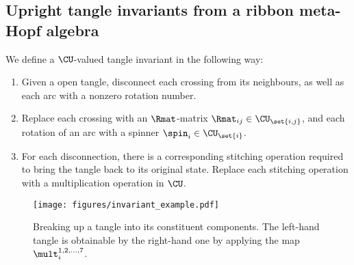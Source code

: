 \subsection{Upright tangle invariants from a ribbon meta-Hopf algebra}
We define a $\CU$-valued tangle invariant in the following way:
\begin{enumerate}
        \item Given a open tangle, disconnect each crossing from its neighbours,
                as well as each arc with a nonzero rotation number.
        \item Replace each crossing with an $\Rmat$-matrix
                $\Rmat_{ij}\in\CU_{\set{i,j}}$, and each rotation of an arc with
                a spinner $\spin_i\in \CU_{\set{i}}$.
        \item For each disconnection, there is a corresponding stitching
                operation required to bring the tangle back to its original
                state. Replace each stitching operation with a multiplication
                operation in $\CU$.
\end{enumerate}

\begin{figure}[h]
        \centering
        \texttt{[image: figures/invariant\_example.pdf]}
        \caption{Breaking up a tangle into its constituent components. The
        left-hand tangle is obtainable by the right-hand one by applying the map
        $\mult^{1,2,\dots,7}_{i}$.}
        \label{fig:invariant_example}
\end{figure}
